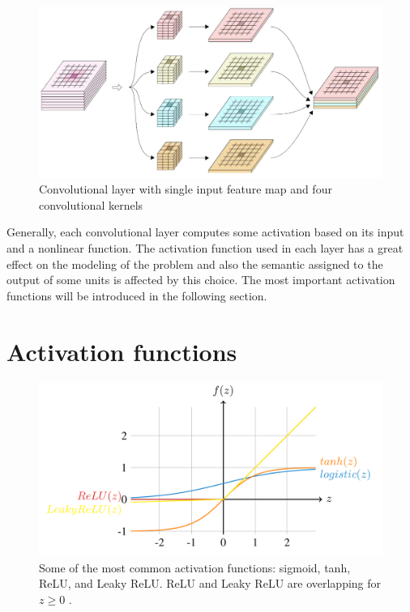 \begin{figure}
    \begin{center}
        \includegraphics[width=\textwidth]{Figures/2DConvKernels.png}
        \caption{Convolutional layer with single input feature map and four convolutional kernels~\cite{chen2017deeplab}}
        \label{conv2Dlayer}
    \end{center}
\end{figure}


Generally, each convolutional layer computes some activation based on its input and a nonlinear function. The activation function used in each layer has a great effect on the modeling of the problem and also the semantic assigned to the output of some units is affected by this choice. The most important activation functions will be introduced in the following section.

\section{Activation functions}\label{sec:activations}
\begin{figure}
\centering
\includegraphics[width=\textwidth]{Figures/Actfuncs.png}
\caption{Some of the most common activation functions: sigmoid, tanh, ReLU, and Leaky ReLU. ReLU and Leaky ReLU are overlapping for $z \geq 0$ \cite{krizhevsky2012imagenet} \cite{lecun1989handwritten}\cite{he2016deep}.}
\label{fig:activations}
\end{figure}

